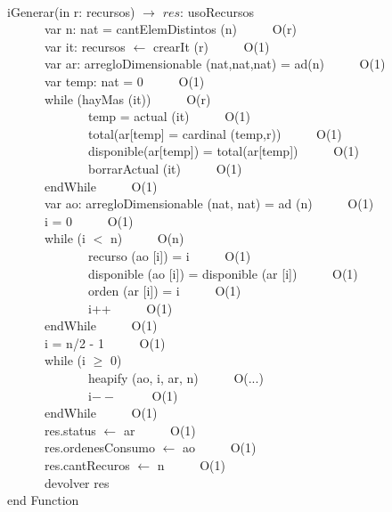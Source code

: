 \documentclass[a4paper,10pt]{article}
\begin{document}
\begin{algoritmo}
\caption{}\\
  iGenerar(in r: recursos) $\rightarrow$ $res$: usoRecursos \\
  \indent \ \ \ \ \ \  var n: nat = cantElemDistintos (n)  \ \ \ \ \ O(r)\\  
	\indent \ \ \ \ \ \  var it: recursos $\gets$ crearIt (r)  \ \ \ \ \ O(1)\\
	\indent \ \ \ \ \ \  var ar: arregloDimensionable (nat,nat,nat) = ad(n)  \ \ \ \ \ O(1)\\  
	\indent \ \ \ \ \ \  var temp: nat = 0  \ \ \ \ \ O(1)\\  
	\indent \ \ \ \ \ \  while (hayMas (it))  \ \ \ \ \ O(r)\\
	\indent \ \ \ \ \ \ \ \ \ \ \ \ \ temp = actual (it) \ \ \ \ \ O(1) \\
	\indent \ \ \ \ \ \ \ \ \ \ \ \ \ total(ar[temp] = cardinal (temp,r)) \ \ \ \ \ O(1) \\
	\indent \ \ \ \ \ \ \ \ \ \ \ \ \ disponible(ar[temp]) = total(ar[temp]) \ \ \ \ \ O(1) \\
	\indent \ \ \ \ \ \ \ \ \ \ \ \ \ borrarActual (it) \ \ \ \ \ O(1) \\
	\indent \ \ \ \ \ \  endWhile \ \ \ \ \ O(1)\\
	\indent \ \ \ \ \ \  var ao: arregloDimensionable (nat, nat) = ad (n) \ \ \ \ \ O(1)\\
	\indent \ \ \ \ \ \  i = 0 \ \ \ \ \ O(1)\\
	\indent \ \ \ \ \ \  while (i $<$ n)  \ \ \ \ \ O(n)\\
	\indent \ \ \ \ \ \ \ \ \ \ \ \ \ recurso (ao [i]) = i \ \ \ \ \ O(1) \\
	\indent \ \ \ \ \ \ \ \ \ \ \ \ \ disponible (ao [i]) = disponible (ar [i]) \ \ \ \ \ O(1) \\
	\indent \ \ \ \ \ \ \ \ \ \ \ \ \ orden (ar [i]) = i \ \ \ \ \ O(1) \\
	\indent \ \ \ \ \ \ \ \ \ \ \ \ \ i++ \ \ \ \ \ O(1) \\
	\indent \ \ \ \ \ \  endWhile \ \ \ \ \ O(1)\\
	\indent \ \ \ \ \ \  i = n/2 - 1 \ \ \ \ \ O(1)\\
	\indent \ \ \ \ \ \  while (i $\geq$ 0)  \\
	\indent \ \ \ \ \ \ \ \ \ \ \ \ \ heapify (ao, i, ar, n) \ \ \ \ \ O(...) \\
	\indent \ \ \ \ \ \ \ \ \ \ \ \ \ i$--$ \ \ \ \ \ O(1) \\
	\indent \ \ \ \ \ \  endWhile \ \ \ \ \ O(1)\\	
	\indent \ \ \ \ \ \  res.status $\gets$ ar  \ \ \ \ \ O(1)\\   
	\indent \ \ \ \ \ \  res.ordenesConsumo $\gets$ ao  \ \ \ \ \ O(1)\\   
	\indent \ \ \ \ \ \  res.cantRecuros $\gets$ n  \ \ \ \ \ O(1)\\   
	\indent \ \ \ \ \ \  devolver res    \\
   end Function \\ 
   

\end{algoritmo}
\end{document}
